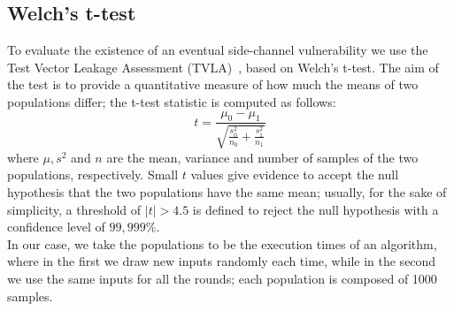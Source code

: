 \subsection{Welch's t-test}
To evaluate the existence of an eventual side-channel vulnerability we use the Test Vector Leakage Assessment (TVLA)~\cite{schneider2015leakage},
based on Welch's t-test. The aim of the test is to provide a quantitative measure of how much the means of two
populations differ; the t-test statistic is computed as follows:
\begin{equation}
    t = \frac{\mu_0 - \mu_1}{\sqrt{\frac{s_0^2}{n_0} + \frac{s_1^2}{n_1}}}
\end{equation}  
where $\mu, s^2$ and $n$ are the mean, variance and number of samples of the two populations, respectively.
Small $t$ values give evidence to accept the null hypothesis that the two populations have the same mean; 
usually, for the sake of simplicity, a threshold of $|t| > 4.5$ is defined to reject the null hypothesis with
a confidence level of $99,999\%$.\\
In our case, we take the populations to be the execution times of an algorithm, where in the first we draw
new inputs randomly each time, while in the second we use the same inputs for all the rounds; each population
is composed of 1000 samples.\\
